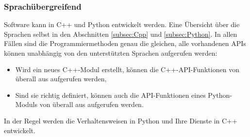 \subsubsection{Sprachübergreifend}
\label{subsubsec:Sprachuebergreifend}
\par Software kann in C++ und Python entwickelt werden. Eine Übersicht über die Sprachen selbst in den Abschnitten \autoref{subsec:Cpp} und \autoref{subsec:Python}. In allen Fällen sind die Programmiermethoden genau die gleichen, alle vorhandenen \acp{API} können unabhängig von den unterstützten Sprachen aufgerufen werden:
\begin{itemize}
    \item Wird ein neues C++-Modul erstellt, können die C++-\ac{API}-Funktionen von überall aus aufgerufen werden,
    \item Sind sie richtig definiert, können auch die \ac{API}-Funktionen eines Python-Moduls von überall aus aufgerufen werden.
\end{itemize}
\par In der Regel werden die Verhaltensweisen in Python und Ihre Dienste in C++ entwickelt.

